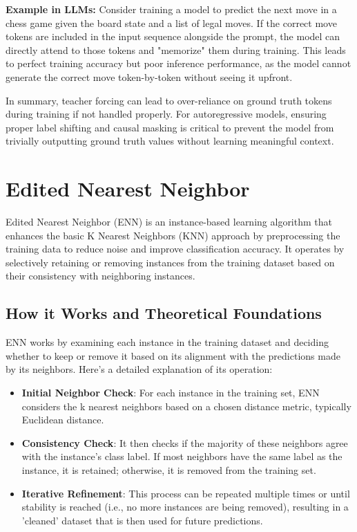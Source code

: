 \documentclass[12pt]{article}
\begin{document}
\textbf{Example in LLMs:} Consider training a model to predict the next move in a chess game given the board state and a list of legal moves. If the correct move tokens are included in the input sequence alongside the prompt, the model can directly attend to those tokens and "memorize" them during training. This leads to perfect training accuracy but poor inference performance, as the model cannot generate the correct move token-by-token without seeing it upfront.

In summary, teacher forcing can lead to over-reliance on ground truth tokens during training if not handled properly. For autoregressive models, ensuring proper label shifting and causal masking is critical to prevent the model from trivially outputting ground truth values without learning meaningful context.


\section{Edited Nearest Neighbor}

Edited Nearest Neighbor (ENN) is an instance-based learning algorithm that enhances the basic K Nearest Neighbors (KNN) approach by preprocessing the training data to reduce noise and improve classification accuracy. It operates by selectively retaining or removing instances from the training dataset based on their consistency with neighboring instances.

\subsection{How it Works and Theoretical Foundations}

ENN works by examining each instance in the training dataset and deciding whether to keep or remove it based on its alignment with the predictions made by its neighbors. Here's a detailed explanation of its operation:

\begin{itemize}
    \item \textbf{Initial Neighbor Check}: For each instance in the training set, ENN considers the k nearest neighbors based on a chosen distance metric, typically Euclidean distance.
    \item \textbf{Consistency Check}: It then checks if the majority of these neighbors agree with the instance's class label. If most neighbors have the same label as the instance, it is retained; otherwise, it is removed from the training set.
    \item \textbf{Iterative Refinement}: This process can be repeated multiple times or until stability is reached (i.e., no more instances are being removed), resulting in a 'cleaned' dataset that is then used for future predictions.
\end{itemize}
\end{document}
